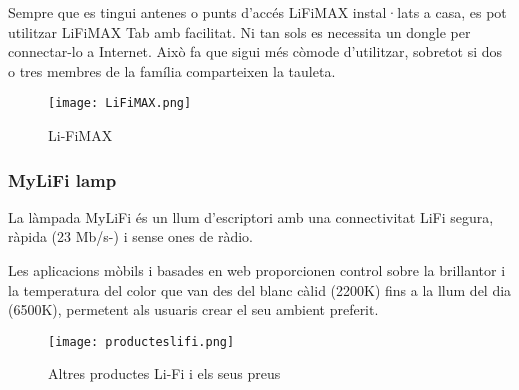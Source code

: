 Sempre que es tingui antenes o punts d'accés LiFiMAX instal·lats a casa, es pot utilitzar LiFiMAX Tab amb facilitat. Ni tan sols es necessita un dongle per connectar-lo a Internet. Això fa que sigui més còmode d'utilitzar, sobretot si dos o tres membres de la família comparteixen la tauleta. 


\begin{figure}[h!]
    \centering
    \texttt{[image: LiFiMAX.png]}
    \caption{Li-FiMAX}
\end{figure}


\subsubsection*{MyLiFi lamp}

La làmpada MyLiFi és un llum d'escriptori amb una connectivitat LiFi segura, ràpida (23 Mb/s-) i sense ones de ràdio.

Les aplicacions mòbils i basades en web proporcionen control sobre la brillantor i la temperatura del color que van des del blanc càlid (2200K) fins a la llum del dia (6500K), permetent als usuaris crear el seu ambient preferit.


\begin{figure}[h!]
    \centering
    \texttt{[image: producteslifi.png]}
    \caption{Altres productes Li-Fi i els seus preus}
\end{figure}
